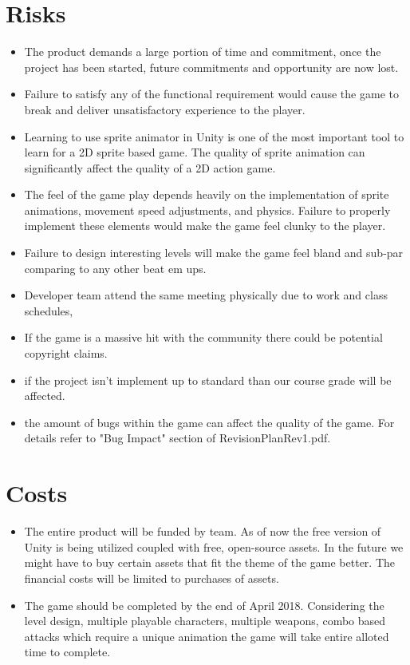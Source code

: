 \documentclass{article}
\begin{document}
	\section{Risks}
	\begin{itemize}
		\item The product demands a large portion of time and commitment, once the project has been started, future commitments and opportunity are now lost.
		\item Failure to satisfy any of the functional requirement would cause the game to break and deliver unsatisfactory experience to the player.
		\item Learning to use sprite animator in Unity is one of the most important tool to learn for a 2D sprite based game. The quality of sprite animation can significantly affect the quality of a 2D action game.
		\item The feel of the game play depends heavily on the implementation of sprite animations, movement speed adjustments, and physics. Failure to properly implement these elements would make the game feel clunky to the player.
		\item Failure to design interesting levels will make the game feel bland and sub-par comparing to any other beat em ups.
		\item Developer team attend the same meeting physically due to work and class schedules, 
		\item If the game is a massive hit with the community  there could be potential copyright claims.
		\item if the project isn’t implement up to standard than our course grade will be affected.
		\item the amount of bugs within the game can affect the quality of the game. For details refer to "Bug Impact" section of RevisionPlanRev1.pdf.
	\end{itemize}

	\section{Costs}
	\begin{itemize}
		\item The entire product will be funded by team. As of now the free version of Unity is being utilized coupled with free, open-source assets. In the future we might have to buy certain assets that fit the theme of the game better. The financial costs will be limited to purchases of assets.
		\item The game should be completed by the end of April 2018. Considering the level design, multiple playable characters, multiple weapons, combo based attacks which require a unique animation the game will take entire alloted time to complete.
	\end{itemize}
\end{document}
